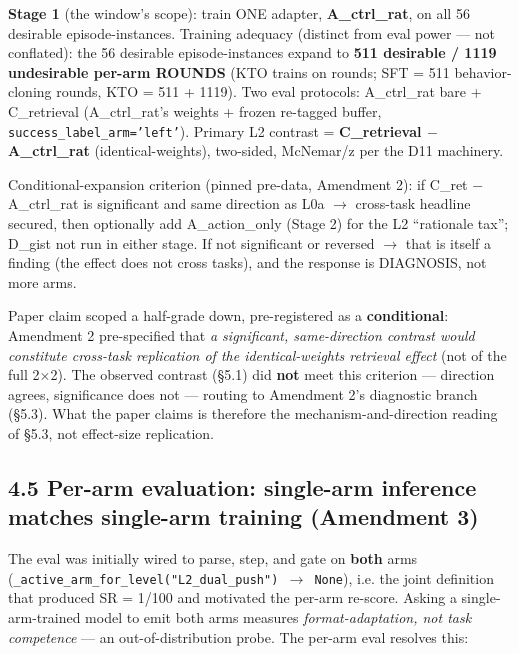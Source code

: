 \textbf{Stage 1} (the window's scope): train ONE adapter, \textbf{A\_ctrl\_rat}, on
all 56 desirable episode-instances. Training adequacy (distinct from eval
power --- not conflated): the 56 desirable episode-instances expand to
\textbf{511 desirable / 1119 undesirable per-arm ROUNDS} (KTO trains on
rounds; SFT = 511 behavior-cloning rounds, KTO = 511 + 1119). Two eval
protocols: A\_ctrl\_rat bare + C\_retrieval (A\_ctrl\_rat's weights + frozen
re-tagged buffer, \texttt{success\_label\_arm='left'}). Primary L2 contrast =
\textbf{C\_retrieval $-$ A\_ctrl\_rat} (identical-weights), two-sided, McNemar/z per
the D11 machinery.

Conditional-expansion criterion (pinned pre-data, Amendment 2): if
C\_ret $-$ A\_ctrl\_rat is significant and same direction as L0a $\rightarrow$ cross-task
headline secured, then optionally add A\_action\_only (Stage 2) for the L2
``rationale tax''; D\_gist not run in either stage. If not significant or
reversed $\rightarrow$ that is itself a finding (the effect does not cross tasks), and
the response is DIAGNOSIS, not more arms.

Paper claim scoped a half-grade down, pre-registered as a \textbf{conditional}:
Amendment 2 pre-specified that \emph{a significant, same-direction contrast
would constitute cross-task replication of the identical-weights retrieval
effect} (not of the full 2$\times$2). The observed contrast (\S5.1) did \textbf{not}
meet this criterion --- direction agrees, significance does not --- routing to
Amendment 2's diagnostic branch (\S5.3). What the paper claims is therefore
the mechanism-and-direction reading of \S5.3, not effect-size replication.

\subsection*{4.5 Per-arm evaluation: single-arm inference matches single-arm training (Amendment 3)}


The eval was initially wired to parse, step, and gate on \textbf{both} arms
(\texttt{\_active\_arm\_for\_level("L2\_dual\_push") $\rightarrow$ None}), i.e. the joint
definition that produced SR = 1/100 and motivated the per-arm re-score.
Asking a single-arm-trained model to emit both arms measures
\emph{format-adaptation, not task competence} --- an out-of-distribution probe.
The per-arm eval resolves this:

